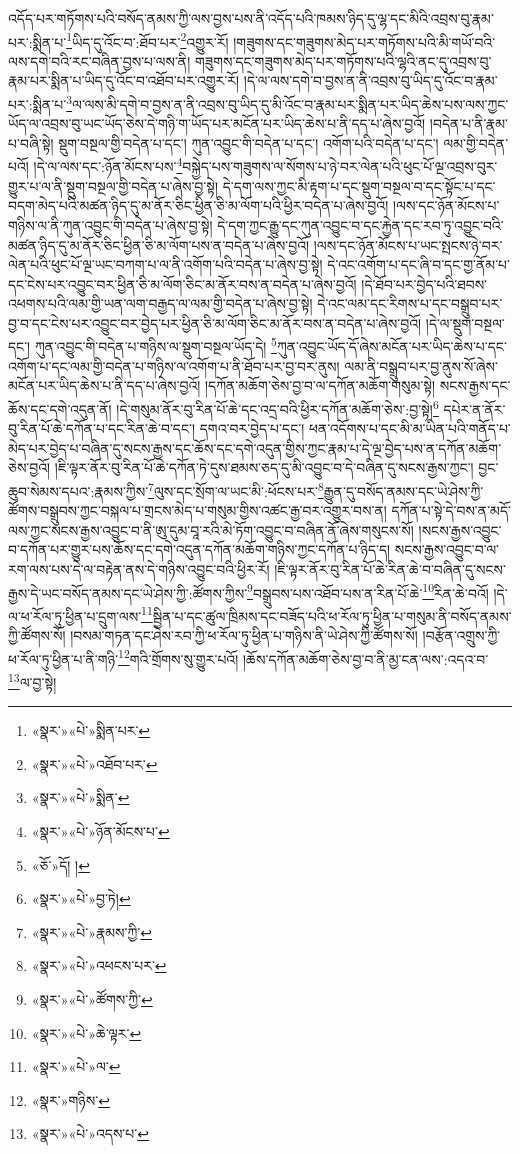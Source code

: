 འདོད་པར་གཏོགས་པའི་བསོད་ནམས་ཀྱི་ལས་བྱས་པས་ནི་འདོད་པའི་ཁམས་ཉིད་དུ་ལྷ་དང་མིའི་འབྲས་བུ་རྣམ་པར་:སྨིན་པ་\footnote{«སྣར་»«པེ་»སྨིན་པར་}ཡིད་དུ་འོང་བ་:ཐོབ་པར་\footnote{«སྣར་»«པེ་»འཐོབ་པར་}འགྱུར་རོ། །གཟུགས་དང་གཟུགས་མེད་པར་གཏོགས་པའི་མི་གཡོ་བའི་ལས་དགེ་བའི་རང་བཞིན་བྱས་པ་ལས་ནི། གཟུགས་དང་གཟུགས་མེད་པར་གཏོགས་པའི་ལྷའི་ནང་དུ་འབྲས་བུ་རྣམ་པར་སྨིན་པ་ཡིད་དུ་འོང་བ་འཐོབ་པར་འགྱུར་རོ། །དེ་ལ་ལས་དགེ་བ་བྱས་ན་ནི་འབྲས་བུ་ཡིད་དུ་འོང་བ་རྣམ་པར་:སྨིན་པ་\footnote{«སྣར་»«པེ་»སྨིན་}ལ་ལས་མི་དགེ་བ་བྱས་ན་ནི་འབྲས་བུ་ཡིད་དུ་མི་འོང་བ་རྣམ་པར་སྨིན་པར་ཡིད་ཆེས་པས་ལས་ཀྱང་ཡོད་ལ་འབྲས་བུ་ཡང་ཡོད་ཅེས་དེ་གཉི་ག་ཡོད་པར་མངོན་པར་ཡིད་ཆེས་པ་ནི་དད་པ་ཞེས་བྱའོ། །བདེན་པ་ནི་རྣམ་པ་བཞི་སྟེ། སྡུག་བསྔལ་གྱི་བདེན་པ་དང་། ཀུན་འབྱུང་གི་བདེན་པ་དང་། འགོག་པའི་བདེན་པ་དང་། ལམ་གྱི་བདེན་པའོ། །དེ་ལ་ལས་དང་:ཉོན་མོངས་པས་\footnote{«སྣར་»«པེ་»ཉོན་མོངས་པ་}བསྐྱེད་པས་གཟུགས་ལ་སོགས་པ་ཉེ་བར་ལེན་པའི་ཕུང་པོ་ལྔ་འབྲས་བུར་གྱུར་པ་ལ་ནི་སྡུག་བསྔལ་གྱི་བདེན་པ་ཞེས་བྱ་སྟེ། དེ་དག་ལས་ཀྱང་མི་རྟག་པ་དང་སྡུག་བསྔལ་བ་དང་སྟོང་པ་དང་བདག་མེད་པའི་མཚན་ཉིད་དུ་མ་ནོར་ཅིང་ཕྱིན་ཅི་མ་ལོག་པའི་ཕྱིར་བདེན་པ་ཞེས་བྱའོ། །ལས་དང་ཉོན་མོངས་པ་གཉིས་ལ་ནི་ཀུན་འབྱུང་གི་བདེན་པ་ཞེས་བྱ་སྟེ། དེ་དག་ཀྱང་རྒྱུ་དང་ཀུན་འབྱུང་བ་དང་རྐྱེན་དང་རབ་ཏུ་འབྱུང་བའི་མཚན་ཉིད་དུ་མ་ནོར་ཅིང་ཕྱིན་ཅི་མ་ལོག་པས་ན་བདེན་པ་ཞེས་བྱའོ། །ལས་དང་ཉོན་མོངས་པ་ཡང་སྤངས་ཉེ་བར་ལེན་པའི་ཕུང་པོ་ལྔ་ཡང་བཀག་པ་ལ་ནི་འགོག་པའི་བདེན་པ་ཞེས་བྱ་སྟེ། དེ་འང་འགོག་པ་དང་ཞི་བ་དང་གྱ་ནོམ་པ་དང་ངེས་པར་འབྱུང་བར་ཕྱིན་ཅི་མ་ལོག་ཅིང་མ་ནོར་བས་ན་བདེན་པ་ཞེས་བྱའོ། །དེ་ཐོབ་པར་བྱེད་པའི་ཐབས་འཕགས་པའི་ལམ་གྱི་ཡན་ལག་བརྒྱད་ལ་ལམ་གྱི་བདེན་པ་ཞེས་བྱ་སྟེ། དེ་འང་ལམ་དང་རིགས་པ་དང་བསྒྲུབ་པར་བྱ་བ་དང་ངེས་པར་འབྱུང་བར་བྱེད་པར་ཕྱིན་ཅི་མ་ལོག་ཅིང་མ་ནོར་བས་ན་བདེན་པ་ཞེས་བྱའོ། །དེ་ལ་སྡུག་བསྔལ་དང་། ཀུན་འབྱུང་གི་བདེན་པ་གཉིས་ལ་སྡུག་བསྔལ་ཡོད་དེ། \footnote{«ཅོ་»དོ། ། }ཀུན་འབྱུང་ཡོད་དོ་ཞེས་མངོན་པར་ཡིད་ཆེས་པ་དང་འགོག་པ་དང་ལམ་གྱི་བདེན་པ་གཉིས་ལ་འགོག་པ་ནི་ཐོབ་པར་བྱ་བར་ནུས། ལམ་ནི་བསྒྲུབ་པར་བྱ་ནུས་སོ་ཞེས་མངོན་པར་ཡིད་ཆེས་པ་ནི་དད་པ་ཞེས་བྱའོ། །དཀོན་མཆོག་ཅེས་བྱ་བ་ལ་དཀོན་མཆོག་གསུམ་སྟེ། སངས་རྒྱས་དང་ཆོས་དང་དགེ་འདུན་ནོ། །དེ་གསུམ་ནོར་བུ་རིན་པོ་ཆེ་དང་འདྲ་བའི་ཕྱིར་དཀོན་མཆོག་ཅེས་:བྱ་སྟེ།\footnote{«སྣར་»«པེ་»བྱ་ཏེ།} དཔེར་ན་ནོར་བུ་རིན་པོ་ཆེ་དཀོན་པ་དང་རིན་ཆེ་བ་དང་། དགའ་བར་བྱེད་པ་དང་། ཕན་འདོགས་པ་དང་མི་མ་ཡིན་པའི་གནོད་པ་མེད་པར་བྱེད་པ་བཞིན་དུ་སངས་རྒྱས་དང་ཆོས་དང་དགེ་འདུན་གྱིས་ཀྱང་རྣམ་པ་དེ་ལྔ་བྱེད་པས་ན་དཀོན་མཆོག་ཅེས་བྱའོ། །ཇི་ལྟར་ནོར་བུ་རིན་པོ་ཆེ་དཀོན་ཏེ་དུས་ཐམས་ཅད་དུ་མི་འབྱུང་བ་དེ་བཞིན་དུ་སངས་རྒྱས་ཀྱང་། བྱང་ཆུབ་སེམས་དཔའ་:རྣམས་ཀྱིས་\footnote{«སྣར་»«པེ་»རྣམས་ཀྱི་}ལུས་དང་སྲོག་ལ་ཡང་མི་:ཕོངས་པར་\footnote{«སྣར་»«པེ་»འཕངས་པར་}རྒྱུན་དུ་བསོད་ནམས་དང་ཡེ་ཤེས་ཀྱི་ཚོགས་བསྒྲུབས་ཀྱང་བསྐལ་པ་གྲངས་མེད་པ་གསུམ་གྱིས་འཚང་རྒྱ་བར་འགྱུར་བས་ན། དཀོན་པ་སྟེ་དེ་བས་ན་མདོ་ལས་ཀྱང་སངས་རྒྱས་འབྱུང་བ་ནི་ཨུ་དུམ་བཱ་རའི་མེ་ཏོག་འབྱུང་བ་བཞིན་ནོ་ཞེས་གསུངས་སོ། །སངས་རྒྱས་འབྱུང་བ་དཀོན་པར་གྱུར་པས་ཆོས་དང་དགེ་འདུན་དཀོན་མཆོག་གཉིས་ཀྱང་དཀོན་པ་ཉིད་ད། སངས་རྒྱས་འབྱུང་བ་ལ་རག་ལས་པས་དེ་ལ་བརྟེན་ནས་དེ་གཉིས་འབྱུང་བའི་ཕྱིར་རོ། །ཇི་ལྟར་ནོར་བུ་རིན་པོ་ཆེ་རིན་ཆེ་བ་བཞིན་དུ་སངས་རྒྱས་དེ་ཡང་བསོད་ནམས་དང་ཡེ་ཤེས་ཀྱི་:ཚོགས་ཀྱིས་\footnote{«སྣར་»«པེ་»ཚོགས་ཀྱི་}བསྒྲུབས་པས་འཐོབ་པས་ན་རིན་པོ་ཆེ་\footnote{«སྣར་»«པེ་»ཆེ་ལྟར་}རིན་ཆེ་བའོ། །དེ་ལ་ཕ་རོལ་ཏུ་ཕྱིན་པ་དྲུག་ལས་\footnote{«སྣར་»«པེ་»ལ་}སྦྱིན་པ་དང་ཚུལ་ཁྲིམས་དང་བཟོད་པའི་ཕ་རོལ་ཏུ་ཕྱིན་པ་གསུམ་ནི་བསོད་ནམས་ཀྱི་ཚོགས་སོ། །བསམ་གཏན་དང་ཤེས་རབ་ཀྱི་ཕ་རོལ་ཏུ་ཕྱིན་པ་གཉིས་ནི་ཡེ་ཤེས་ཀྱི་ཚོགས་སོ། །བརྩོན་འགྲུས་ཀྱི་ཕ་རོལ་ཏུ་ཕྱིན་པ་ནི་གཉི་\footnote{«སྣར་»གཉིས་}གའི་གྲོགས་སུ་གྱུར་པའོ། །ཆོས་དཀོན་མཆོག་ཅེས་བྱ་བ་ནི་མྱ་ངན་ལས་:འདའ་བ་\footnote{«སྣར་»«པེ་»འདས་པ་}ལ་བྱ་སྟེ། 